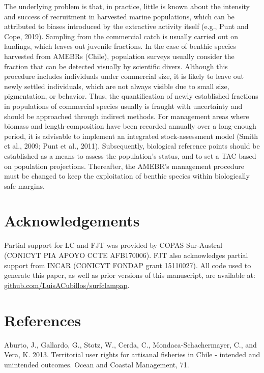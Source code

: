 \documentclass[12pt]{article}
\begin{document}
The underlying problem is that, in practice, little is known about the
intensity and success of recruitment in harvested marine populations,
which can be attributed to biases introduced by the extractive activity
itself (e.g., Punt and Cope, 2019). Sampling from the commercial catch
is usually carried out on landings, which leaves out juvenile fractions.
In the case of benthic species harvested from AMEBRs (Chile), population
surveys usually consider the fraction that can be detected visually by
scientific divers. Although this procedure includes individuals under
commercial size, it is likely to leave out newly settled individuals,
which are not always visible due to small size, pigmentation, or
behavior. Thus, the quantification of newly established fractions in
populations of commercial species usually is fraught with uncertainty
and should be approached through indirect methods. For management areas
where biomass and length-composition have been recorded annually over a
long-enough period, it is advisable to implement an integrated
stock-assessment model (Smith et al., 2009; Punt et al., 2011).
Subsequently, biological reference points should be established as a
means to assess the population's status, and to set a TAC based on
population projections. Thereafter, the AMEBR's management procedure
must be changed to keep the exploitation of benthic species within
biologically safe margins.

\hypertarget{acknowledgements}{%
\section{Acknowledgements}\label{acknowledgements}}

Partial support for LC and FJT was provided by COPAS Sur-Austral
(CONICYT PIA APOYO CCTE AFB170006). FJT also acknowledges partial
support from INCAR (CONICYT FONDAP grant 15110027). All code used to
generate this paper, as well as prior versions of this manuscript, are
available at:
\href{https://github.com/LuisACubillos/surfclampap}{github.com/LuisACubillos/surfclampap}.

\FloatBarrier

\hypertarget{references}{%
\section{References}\label{references}}

Aburto, J., Gallardo, G., Stotz, W., Cerda, C., Mondaca-Schachermayer,
C., and Vera, K. 2013. Territorial user rights for artisanal fisheries
in Chile - intended and unintended outcomes. Ocean and Coastal
Management, 71.
\end{document}
